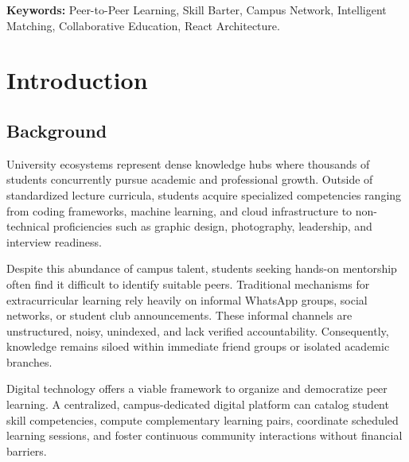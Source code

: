 \documentclass[12pt,a4paper]{report}
\begin{document}
\vspace{1cm}
\noindent\textbf{Keywords:} Peer-to-Peer Learning, Skill Barter, Campus Network, Intelligent Matching, Collaborative Education, React Architecture.

\newpage
\tableofcontents

\newpage
\listoffigures

\newpage
\listoftables

\newpage
\chapter{Introduction}

\section{Background}
University ecosystems represent dense knowledge hubs where thousands of students concurrently pursue academic and professional growth. Outside of standardized lecture curricula, students acquire specialized competencies ranging from coding frameworks, machine learning, and cloud infrastructure to non-technical proficiencies such as graphic design, photography, leadership, and interview readiness.

Despite this abundance of campus talent, students seeking hands-on mentorship often find it difficult to identify suitable peers. Traditional mechanisms for extracurricular learning rely heavily on informal WhatsApp groups, social networks, or student club announcements. These informal channels are unstructured, noisy, unindexed, and lack verified accountability. Consequently, knowledge remains siloed within immediate friend groups or isolated academic branches.

Digital technology offers a viable framework to organize and democratize peer learning. A centralized, campus-dedicated digital platform can catalog student skill competencies, compute complementary learning pairs, coordinate scheduled learning sessions, and foster continuous community interactions without financial barriers.
\end{document}
